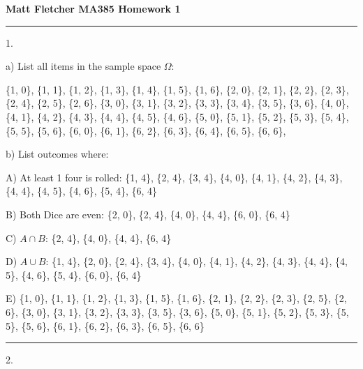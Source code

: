 \documentclass{article}
\begin{document}
	

\thispagestyle{empty}

\let\oldemptyset\emptyset
\let\emptyset\varnothing


\newcommand*{\Perm}[2]{{}^{#1}\!P_{#2}}
\newcommand*{\Comb}[2]{{}^{#1}C_{#2}}


	
\textbf{	Matt Fletcher MA385 Homework 1}
\smallskip

\noindent\rule{8cm}{0.4pt}

1. 

a) List all items in the sample space $\Omega$:

\{1, 0\}, \{1, 1\}, \{1, 2\}, \{1, 3\}, \{1, 4\}, \{1, 5\}, \{1, 6\}, \{2, 0\}, \{2, 1\}, \{2, 2\}, \{2, 3\}, \{2, 4\}, \{2, 5\}, \{2, 6\}, \{3, 0\}, \{3, 1\}, \{3, 2\}, \{3, 3\}, \{3, 4\}, \{3, 5\}, \{3, 6\}, \{4, 0\}, \{4, 1\}, \{4, 2\}, \{4, 3\}, \{4, 4\}, \{4, 5\}, \{4, 6\}, \{5, 0\}, \{5, 1\}, \{5, 2\}, \{5, 3\}, \{5, 4\}, \{5, 5\}, \{5, 6\}, \{6, 0\}, \{6, 1\}, \{6, 2\}, \{6, 3\}, \{6, 4\}, \{6, 5\}, \{6, 6\},

b)  List outcomes where:


A) At least 1 four is rolled: \{1, 4\}, \{2, 4\}, \{3, 4\}, \{4, 0\}, \{4, 1\}, \{4, 2\}, \{4, 3\}, \{4, 4\}, \{4, 5\}, \{4, 6\}, \{5, 4\}, \{6, 4\}

B) Both Dice are even:  \{2, 0\}, \{2, 4\}, \{4, 0\}, \{4, 4\}, \{6, 0\}, \{6, 4\}

C) $A \cap B$: \{2, 4\}, \{4, 0\}, \{4, 4\}, \{6, 4\}

D) $A \cup B$: \{1, 4\}, \{2, 0\}, \{2, 4\}, \{3, 4\}, \{4, 0\}, \{4, 1\}, \{4, 2\}, \{4, 3\}, \{4, 4\}, \{4, 5\}, \{4, 6\}, \{5, 4\}, \{6, 0\}, \{6, 4\}

E)  \{1, 0\}, \{1, 1\}, \{1, 2\}, \{1, 3\}, \{1, 5\}, \{1, 6\}, \{2, 1\}, \{2, 2\}, \{2, 3\}, \{2, 5\}, \{2, 6\}, \{3, 0\}, \{3, 1\}, \{3, 2\}, \{3, 3\}, \{3, 5\}, \{3, 6\}, \{5, 0\}, \{5, 1\}, \{5, 2\}, \{5, 3\}, \{5, 5\}, \{5, 6\}, \{6, 1\}, \{6, 2\}, \{6, 3\}, \{6, 5\}, \{6, 6\}

\noindent\rule{8cm}{0.4pt}

2. 
\end{document}
